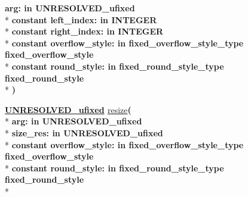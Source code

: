 \begin{DoxyCompactItemize}
{\bfseries \textcolor{vhdlchar}{arg\+: }\textcolor{stringliteral}{in }\textcolor{vhdlchar}{U\+N\+R\+E\+S\+O\+L\+V\+E\+D\+\_\+ufixed}}\\*
{\bfseries {\bfseries \textcolor{keywordflow}{constant}\textcolor{vhdlchar}{ }}\textcolor{vhdlchar}{left\+\_\+index\+: }\textcolor{stringliteral}{in }{\bfseries \textcolor{comment}{I\+N\+T\+E\+G\+E\+R}\textcolor{vhdlchar}{ }}}\\*
{\bfseries {\bfseries \textcolor{keywordflow}{constant}\textcolor{vhdlchar}{ }}\textcolor{vhdlchar}{right\+\_\+index\+: }\textcolor{stringliteral}{in }{\bfseries \textcolor{comment}{I\+N\+T\+E\+G\+E\+R}\textcolor{vhdlchar}{ }}}\\*
{\bfseries {\bfseries \textcolor{keywordflow}{constant}\textcolor{vhdlchar}{ }}\textcolor{vhdlchar}{overflow\+\_\+style\+: }\textcolor{stringliteral}{in }\textcolor{vhdlchar}{fixed\+\_\+overflow\+\_\+style\+\_\+type     fixed\+\_\+overflow\+\_\+style}}\\*
{\bfseries {\bfseries \textcolor{keywordflow}{constant}\textcolor{vhdlchar}{ }}\textcolor{vhdlchar}{round\+\_\+style\+: }\textcolor{stringliteral}{in }\textcolor{vhdlchar}{fixed\+\_\+round\+\_\+style\+\_\+type     fixed\+\_\+round\+\_\+style}}\\*
{\bfseries  )} 
\item 
{\bfseries {\bfseries {\bfseries \hyperlink{classfixed__pkg_ae78bc2b36d22f6abeac163955e8a587d}{U\+N\+R\+E\+S\+O\+L\+V\+E\+D\+\_\+ufixed}} \textcolor{vhdlchar}{ }}} \hyperlink{classfixed__pkg_af034c1c5f4d397445d06a2b331870d7f}{resize}{\bfseries  ( }\\*
{\bfseries \textcolor{vhdlchar}{arg\+: }\textcolor{stringliteral}{in }\textcolor{vhdlchar}{U\+N\+R\+E\+S\+O\+L\+V\+E\+D\+\_\+ufixed}}\\*
{\bfseries \textcolor{vhdlchar}{size\+\_\+res\+: }\textcolor{stringliteral}{in }\textcolor{vhdlchar}{U\+N\+R\+E\+S\+O\+L\+V\+E\+D\+\_\+ufixed}}\\*
{\bfseries {\bfseries \textcolor{keywordflow}{constant}\textcolor{vhdlchar}{ }}\textcolor{vhdlchar}{overflow\+\_\+style\+: }\textcolor{stringliteral}{in }\textcolor{vhdlchar}{fixed\+\_\+overflow\+\_\+style\+\_\+type     fixed\+\_\+overflow\+\_\+style}}\\*
{\bfseries {\bfseries \textcolor{keywordflow}{constant}\textcolor{vhdlchar}{ }}\textcolor{vhdlchar}{round\+\_\+style\+: }\textcolor{stringliteral}{in }\textcolor{vhdlchar}{fixed\+\_\+round\+\_\+style\+\_\+type     fixed\+\_\+round\+\_\+style}}\\*

\end{DoxyCompactItemize}
